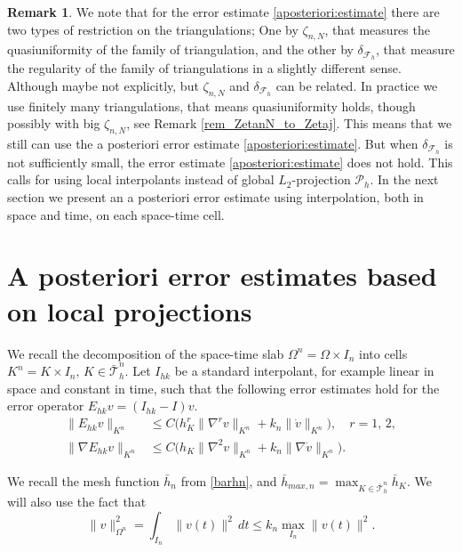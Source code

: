 \documentclass{amsart}
\numberwithin{equation}{section}
\theoremstyle{definition}
\newtheorem{remark}{Remark}
\begin{document}
\begin{remark} \label{rem_ZetaDelta}
We note that for the error estimate \eqref{aposteriori:estimate} 
there are two types of restriction on the  triangulations;
One by $\zeta_{n,N}$, that measures
the quasiuniformity of the family of triangulation, and the
other by $\delta_{{\mathcal F}_h}$, that
measure the regularity of the family of triangulations in a
slightly different sense.
Although maybe not explicitly, but $\zeta_{n,N}$ and
$\delta_{{\mathcal F}_h}$ can be related. In practice we use
finitely many triangulations, that means quasiuniformity holds, 
though possibly with big $\zeta_{n,N}$, 
see Remark \ref{rem_ZetanN_to_Zetaj}. 
This means that we still can use the a posteriori error estimate
\eqref{aposteriori:estimate}.
But when $\delta_{{\mathcal F}_h}$ is not sufficiently small, the
error estimate \eqref{aposteriori:estimate} does not hold.
This calls for using local interpolants instead of global
$L_2$-projection  ${\mathcal P}_h$.
In the next section we present an a posteriori error estimate
using interpolation, both in space and time, 
on each space-time cell. 
\end{remark}
\section{{\bf A posteriori error estimates based on local projections}}
We recall the decomposition of the space-time slab $\Omega^n=\Omega\times I_n$ into cells
$K^n=K\times I_n,\,K\in\bar{\mathcal T}_h^n$.
Let $I_{hk}$ be a standard interpolant, for example linear in space 
and constant in time, such that 
the following error estimates hold for the error operator 
$E_{hk}v=(I_{hk}-I)v$.
\begin{align}   \label{errorIhk:1}
   \|E_{hk}v\|_{K^n}
   &\le C \big(h_K^r\|\nabla^rv\|_{K^n}
     +k_n\| \dot v\|_{K^n}\big),\quad r=1,\,2,\\ \label{errorIhk:2}
   \|\nabla E_{hk}v\|_{K^n}
   &\le C \big(h_K\|\nabla^2v\|_{K^n}
     +k_n\|\nabla \dot v\|_{K^n}\big).
\end{align}

We recall the mesh function $\bar h_n$ from \eqref{barhn}, 
and $\bar h_{max,n}=\max_{K\in \bar{\mathcal T}_h^n}\bar h_K$.  
We will also use the fact that
\begin{equation}   \label{Omega:n}
  \|v\|_{\Omega^n}^2=\int_{I_n}\!\|v(t)\|^2\,dt
  \le k_n\max_{I_n}\|v(t)\|^2.
\end{equation}
\end{document}
